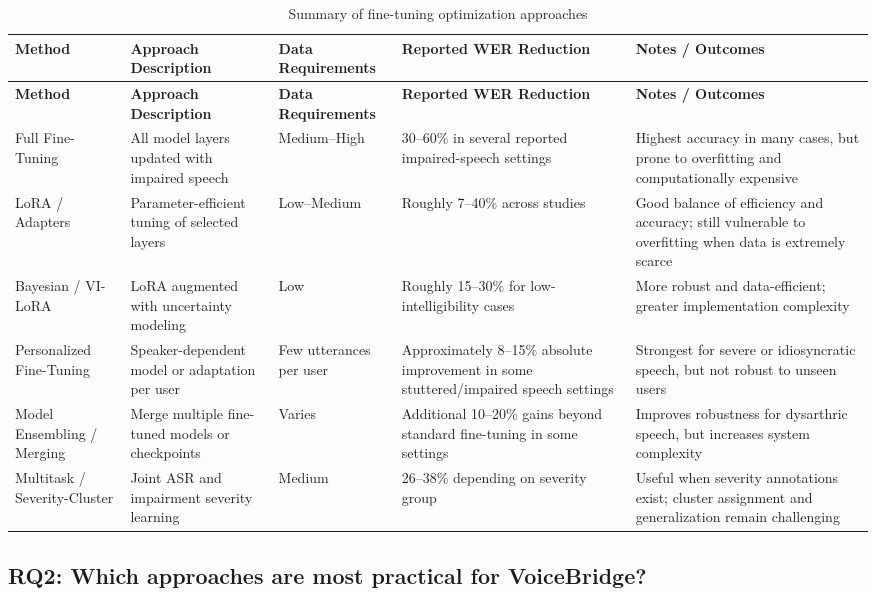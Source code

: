 \documentclass{article}
\begin{document}
\begin{longtable}{p{2.7cm} p{3.0cm} p{2.3cm} p{3.0cm} p{3.5cm}}
\caption{Summary of fine-tuning optimization approaches} \\
\toprule
\textbf{Method} & \textbf{Approach Description} & \textbf{Data Requirements} & \textbf{Reported WER Reduction} & \textbf{Notes / Outcomes} \\
\midrule
\endfirsthead
\toprule
\textbf{Method} & \textbf{Approach Description} & \textbf{Data Requirements} & \textbf{Reported WER Reduction} & \textbf{Notes / Outcomes} \\
\midrule
\endhead
Full Fine-Tuning & All model layers updated with impaired speech & Medium--High & 30--60\% in several reported impaired-speech settings & Highest accuracy in many cases, but prone to overfitting and computationally expensive \\
LoRA / Adapters & Parameter-efficient tuning of selected layers & Low--Medium & Roughly 7--40\% across studies & Good balance of efficiency and accuracy; still vulnerable to overfitting when data is extremely scarce \\
Bayesian / VI-LoRA & LoRA augmented with uncertainty modeling & Low & Roughly 15--30\% for low-intelligibility cases & More robust and data-efficient; greater implementation complexity \\
Personalized Fine-Tuning & Speaker-dependent model or adaptation per user & Few utterances per user & Approximately 8--15\% absolute improvement in some stuttered/impaired speech settings & Strongest for severe or idiosyncratic speech, but not robust to unseen users \\
Model Ensembling / Merging & Merge multiple fine-tuned models or checkpoints & Varies & Additional 10--20\% gains beyond standard fine-tuning in some settings & Improves robustness for dysarthric speech, but increases system complexity \\
Multitask / Severity-Cluster & Joint ASR and impairment severity learning & Medium & 26--38\% depending on severity group & Useful when severity annotations exist; cluster assignment and generalization remain challenging \\
\bottomrule
\end{longtable}

\subsection*{RQ2: Which approaches are most practical for VoiceBridge?}
\end{document}
